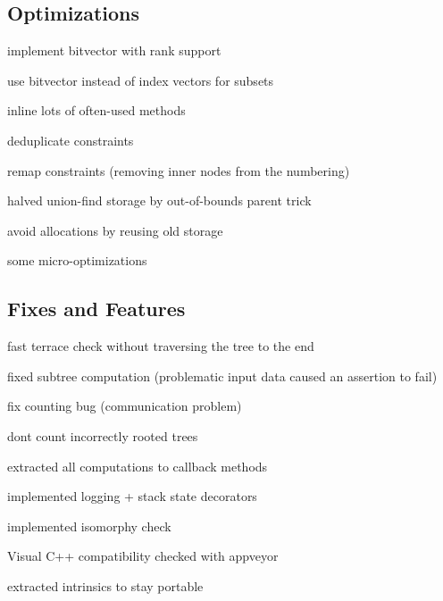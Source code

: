 \subsection*{Optimizations }


\begin{DoxyItemize}
\item implement bitvector with rank support
\item use bitvector instead of index vectors for subsets
\item inline lots of often-\/used methods
\item deduplicate constraints
\item remap constraints (removing inner nodes from the numbering)
\item halved union-\/find storage by out-\/of-\/bounds parent trick
\item avoid allocations by reusing old storage
\item some micro-\/optimizations
\end{DoxyItemize}

\subsection*{Fixes and Features }


\begin{DoxyItemize}
\item fast terrace check without traversing the tree to the end
\item fixed subtree computation (problematic input data caused an assertion to fail)
\item fix counting bug (communication problem)
\item don\textquotesingle{}t count incorrectly rooted trees
\item extracted all computations to callback methods
\item implemented logging + stack state decorators
\item implemented isomorphy check
\item Visual C++ compatibility checked with appveyor
\item extracted intrinsics to stay portable 
\end{DoxyItemize}